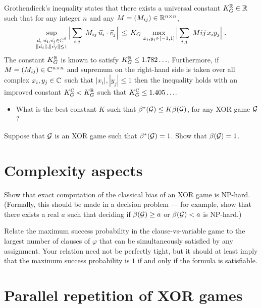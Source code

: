 \begin{exercise}
Grothendieck's inequality states that there exists a universal constant $K_G^{\mathbb{R}}\in\mathbb{R}$ such that for any integer $n$ and any $M=(M_{ij})\in \mathbb{R}^{n\times n}$, 
\[\sup_{\substack{d,\;\vec{u}_i,\vec{v}_j\in \mathbb{C}^{d}\\ \|\vec{u}_i\|,\|\vec{v}_j\|\leq 1}} \Big|\sum_{i,j} \; M_{ij}\, \vec{u}_i\cdot \vec{v}_j \Big|\,\leq\, K_G\, \max_{x_i,y_j\in [-1,1]} \Big|\sum_{i,j} \; M{ij}\, x_i y_j \Big|\;.\]
The constant $K_G^{\mathbb{R}}$ is known to satisfy $K_G^{\mathbb{R}} \leq 1.782\ldots$.
Furthermore, if $M=(M_{ij})\in \mathbb{C}^{n\times n}$ and supremum on the right-hand side is taken over all complex $x_i,y_j\in \mathbb{C}$ such that $|x_i|,|y_j|\leq 1$ then the inequality holds with an improved constant $K_G^{\mathbb{C}} < K_G^{\mathbb{R}}$ such that $K_G^{\mathbb{C}} \leq 1.405\ldots$.
\begin{itemize}
\item What is the best constant $K$ such that $\beta^*(\mathcal{G}) \leq K \beta(\mathcal{G})$, for any XOR game $\mathcal{G}$?
\end{itemize}
\end{exercise}



\begin{exercise}
Suppose that $\mathcal{G}$ is an XOR game such that $\beta^*(\mathcal{G})=1$. Show that $\beta(\mathcal{G})=1$. 
\end{exercise}

\section{Complexity aspects}

\begin{exercise}
Show that exact computation of the classical bias of an XOR game is NP-hard. (Formally, this should be made in a decision problem --- for example, show that there exists a real $a$ such that deciding if $\beta(\mathcal{G})\geq a$ or $\beta(\mathcal{G})<a$ is NP-hard.)
\end{exercise}

\begin{exercise}
Relate the maximum success probability in the clause-vs-variable game to the largest number of clauses of $\varphi$ that can be simultaneously satisfied by any assignment. Your relation need not be perfectly tight, but it should at least imply that the maximum success probability is $1$ if and only if the formula is satisfiable. 
\end{exercise}

\section{Parallel repetition of XOR games}


